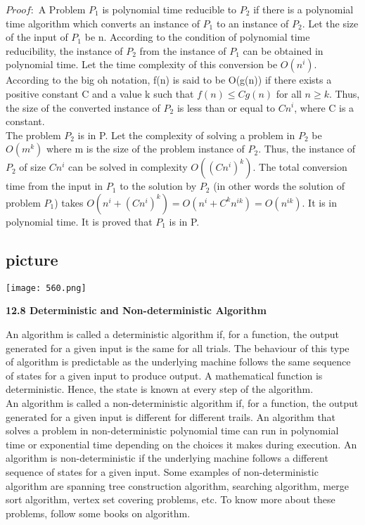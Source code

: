 \documentclass[11pt]{article}
\begin{document}
\vspace*{0.2cm}
\textbf{$Proof:$} A Problem $P_{1}$ is polynomial time reducible to $P_{2}$ if there is a polynomial time algorithm which
converts an instance of $P_{1}$ to an instance of $P_{2}$. Let the size of the input of $P_{1}$ be n. According to the
condition of polynomial time reducibility, the instance of $P_{2}$ from the instance of $P_{1}$ can be obtained in
polynomial time. Let the time complexity of this conversion be $O(n^{i})$. According to the big oh notation,
f(n) is said to be O(g(n)) if there exists a positive constant C and a value k such that $f(n) \leq Cg(n)$ for all
$n \geq k$. Thus, the size of the converted instance of $P_{2}$ is less than or equal to $Cn^{i}$, where C is a constant.\\
The problem $P_{2}$ is in P. Let the complexity of solving a problem in $P_{2}$ be $O(m^{k})$ where m is the size of the
problem instance of $P_{2}$. Thus, the instance of $P_{2}$ of size $Cn^{i}$ can be solved in complexity $O((Cn^{i})^{k})$. The
total conversion time from the input in $P_{1}$ to the solution by $P_{2}$ (in other words the solution of problem
$P_{1}$) takes $O(n^{i} +(Cn^{i})^{k}) = O(n^{i} +C^{k}n^{ik}) = O(n^{ik})$. It is in polynomial time. It is proved that $P_{1}$ is in P.\\

\begin{center}
\section{picture}
\texttt{[image: 560.png]}
\end{center}

\large{
\textbf{12.8 Deterministic and Non-deterministic Algorithm}\\
}

\vspace*{0.2cm}
\small{An algorithm is called a deterministic algorithm if, for a function, the output generated for a given input
is the same for all trials. The behaviour of this type of algorithm is predictable as the underlying machine
follows the same sequence of states for a given input to produce output.}
 A mathematical function is deterministic. Hence, the state is known at every step of the algorithm.\\
\hspace*{0.5cm}An algorithm is called a non-deterministic algorithm if, for a function, the output generated for a
given input is different for different trails. An algorithm that solves a problem in non-deterministic polynomial
time can run in polynomial time or exponential time depending on the choices it makes during
execution. An algorithm is non-deterministic if the underlying machine follows a different sequence of
states for a given input. Some examples of non-deterministic algorithm are spanning tree construction
algorithm, searching algorithm, merge sort algorithm, vertex set covering problems, etc. To know more
about these problems, follow some books on algorithm.\\
\end{document}
